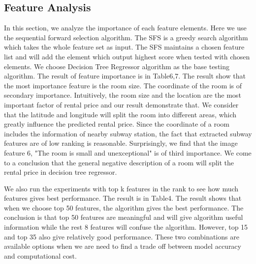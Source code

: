 \documentclass[final]{cvpr}
\begin{document}
\subsection{Feature Analysis}
In this section, we analyze the importance of each feature elements. Here we use the sequential forward selection algorithm. The SFS is a greedy search algorithm which takes the whole feature set as input. The SFS maintains a chosen feature list and will add the element which output highest score when tested with chosen elements. We choose Decision Tree Regressor algorithm as the base testing algorithm. The result of feature importance is in Table6,7. The result show that the most importance feature is the room size. The coordinate of the room is of secondary importance. Intuitively, the room size and the location are the most important factor of rental price and our result demonstrate that. We consider that the latitude and longitude will split the room into different areas, which greatly influence the predicted rental price. Since the coordinate of a room includes the information of nearby subway station, the fact that extracted subway features are of low ranking is reasonable. Surprisingly, we find that the image feature 6, "The room is small and unexceptional" is of third importance. We come to a conclusion that the general negative description of a room will split the rental price in decision tree regressor. 

We also run the experiments with top k features in the rank to see how much features gives best performance. The result is in Table4. The result shows that when we choose top 50 features, the algorithm gives the best performance. The conclusion is that top 50 features are meaningful and will give algorithm useful information while the rest 8 features will confuse the algorithm. However, top 15 and top 35 also give relatively good performance. These two combinations are available options when we are need to find a trade off between model accuracy and computational cost.
\end{document}
